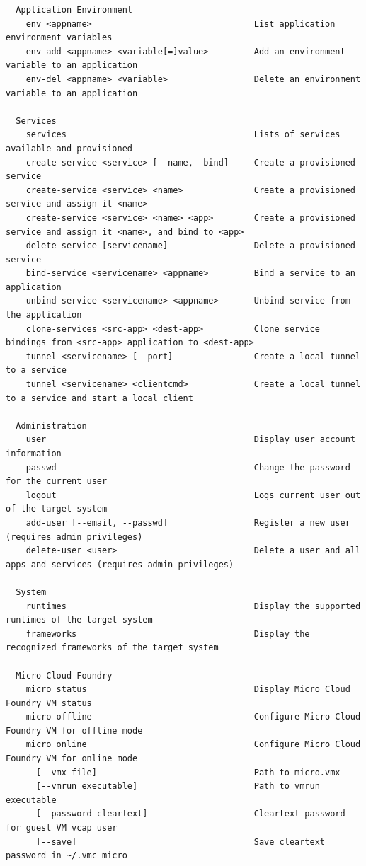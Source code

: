 \begin{lstlisting}
  Application Environment 
    env <appname>                                List application environment variables 
    env-add <appname> <variable[=]value>         Add an environment variable to an application 
    env-del <appname> <variable>                 Delete an environment variable to an application 

  Services 
    services                                     Lists of services available and provisioned 
    create-service <service> [--name,--bind]     Create a provisioned service 
    create-service <service> <name>              Create a provisioned service and assign it <name> 
    create-service <service> <name> <app>        Create a provisioned service and assign it <name>, and bind to <app> 
    delete-service [servicename]                 Delete a provisioned service 
    bind-service <servicename> <appname>         Bind a service to an application 
    unbind-service <servicename> <appname>       Unbind service from the application 
    clone-services <src-app> <dest-app>          Clone service bindings from <src-app> application to <dest-app> 
    tunnel <servicename> [--port]                Create a local tunnel to a service 
    tunnel <servicename> <clientcmd>             Create a local tunnel to a service and start a local client 

  Administration 
    user                                         Display user account information 
    passwd                                       Change the password for the current user 
    logout                                       Logs current user out of the target system 
    add-user [--email, --passwd]                 Register a new user (requires admin privileges) 
    delete-user <user>                           Delete a user and all apps and services (requires admin privileges) 

  System 
    runtimes                                     Display the supported runtimes of the target system 
    frameworks                                   Display the recognized frameworks of the target system 

  Micro Cloud Foundry 
    micro status                                 Display Micro Cloud Foundry VM status 
    micro offline                                Configure Micro Cloud Foundry VM for offline mode 
    micro online                                 Configure Micro Cloud Foundry VM for online mode 
      [--vmx file]                               Path to micro.vmx 
      [--vmrun executable]                       Path to vmrun executable 
      [--password cleartext]                     Cleartext password for guest VM vcap user 
      [--save]                                   Save cleartext password in ~/.vmc_micro 


\end{lstlisting}
